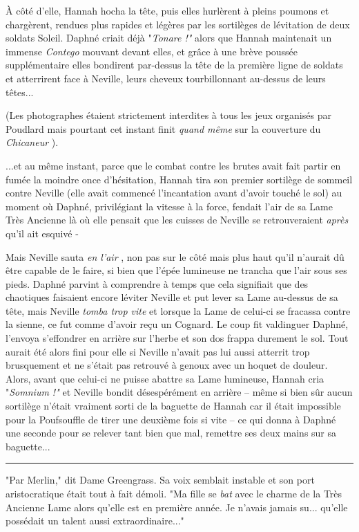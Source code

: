 À côté d'elle, Hannah hocha la tête, puis elles hurlèrent à pleins poumons et chargèrent, rendues plus rapides et légères par les sortilèges de lévitation de deux soldats Soleil. Daphné criait déjà "\emph{Tonare !"}  alors que Hannah maintenait un immense \emph{Contego}  mouvant devant elles, et grâce à une brève poussée supplémentaire elles bondirent par-dessus la tête de la première ligne de soldats et atterrirent face à Neville, leurs cheveux tourbillonnant au-dessus de leurs têtes...

(Les photographes étaient strictement interdites à tous les jeux organisés par Poudlard mais pourtant cet instant finit \emph{quand même}  sur la couverture du \emph{Chicaneur} ).

...et au même instant, parce que le combat contre les brutes avait fait partir en fumée la moindre once d'hésitation, Hannah tira son premier sortilège de sommeil contre Neville (elle avait commencé l'incantation avant d'avoir touché le sol) au moment où Daphné, privilégiant la vitesse à la force, fendait l'air de sa Lame Très Ancienne là où elle pensait que les cuisses de Neville se retrouveraient \emph{après}  qu'il ait esquivé -

Mais Neville sauta \emph{en l'air} , non pas sur le côté mais plus haut qu'il n'aurait dû être capable de le faire, si bien que l'épée lumineuse ne trancha que l'air sous ses pieds. Daphné parvint à comprendre à temps que cela signifiait que des chaotiques faisaient encore léviter Neville et put lever sa Lame au-dessus de sa tête, mais Neville \emph{tomba trop vite } et lorsque la Lame de celui-ci se fracassa contre la sienne, ce fut comme d'avoir reçu un Cognard. Le coup fit valdinguer Daphné, l'envoya s'effondrer en arrière sur l'herbe et son dos frappa durement le sol. Tout aurait été alors fini pour elle si Neville n'avait pas lui aussi atterrit trop brusquement et ne s'était pas retrouvé à genoux avec un hoquet de douleur. Alors, avant que celui-ci ne puisse abattre sa Lame lumineuse, Hannah cria "\emph{Somnium !"}  et Neville bondit désespérément en arrière – même si bien sûr aucun sortilège n'était vraiment sorti de la baguette de Hannah car il était impossible pour la Poufsouffle de tirer une deuxième fois si vite – ce qui donna à Daphné une seconde pour se relever tant bien que mal, remettre ses deux mains sur sa baguette...
\par\noindent\rule{\textwidth}{0.4pt}
"Par Merlin," dit Dame Greengrass. Sa voix semblait instable et son port aristocratique était tout à fait démoli. "Ma fille se \emph{bat } avec le charme de la Très Ancienne Lame alors qu'elle est en première année. Je n'avais jamais su... qu'elle possédait un talent aussi extraordinaire..."

